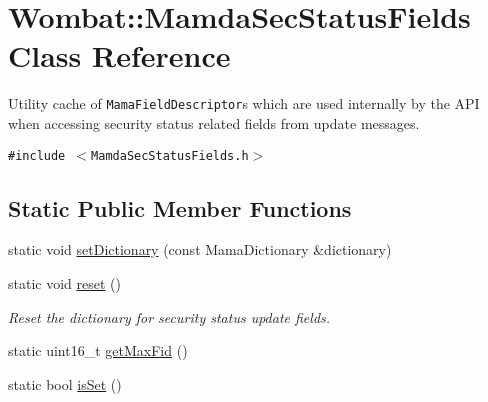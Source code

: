 \hypertarget{classWombat_1_1MamdaSecStatusFields}{
\section{Wombat::Mamda\-Sec\-Status\-Fields Class Reference}
\label{classWombat_1_1MamdaSecStatusFields}
}
Utility cache of {\tt Mama\-Field\-Descriptor}s which are used internally by the API when accessing security status related fields from update messages.  


{\tt \#include $<$Mamda\-Sec\-Status\-Fields.h$>$}

\subsection*{Static Public Member Functions}
\begin{CompactItemize}
\item 
static void \hyperlink{classWombat_1_1MamdaSecStatusFields_17d03af8bead7f50d20d3bef3752df39}{set\-Dictionary} (const Mama\-Dictionary \&dictionary)
\item 
static void \hyperlink{classWombat_1_1MamdaSecStatusFields_12b1044449ea4ba845122fdf708b5615}{reset} ()
\begin{CompactList}\small\item\em Reset the dictionary for security status update fields. \item\end{CompactList}\item 
static uint16\_\-t \hyperlink{classWombat_1_1MamdaSecStatusFields_1c3eacda9d519ad0eb43ffd061e03a3b}{get\-Max\-Fid} ()
\item 
static bool \hyperlink{classWombat_1_1MamdaSecStatusFields_8fb0b970030599ffdba6ba1811d5d377}{is\-Set} ()
\end{CompactItemize}
